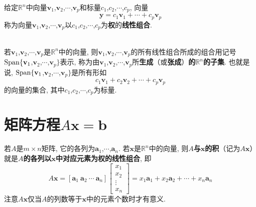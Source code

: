 给定$\mathbb{R}^n$中向量$\mathbf{v}_1$,$\mathbf{v}_2$,$\cdots$,$\mathbf{v}_p$和标量$c_1$,$c_2$,$\cdots$,$c_p$, 向量
	\[\mathbf{y}=c_1\mathbf{v}_1+\cdots+c_p\mathbf{v}_p\]
称为向量$\mathbf{v}_1$,$\mathbf{v}_2$,$\cdots$,$\mathbf{v}_p$以$c_1$,$c_2$,$\cdots$,$c_p$为\textbf{权}的\textbf{线性组合}.\\[2ex]

\\[4ex]

\begin{definition}
若$\mathbf{v}_1$,$\mathbf{v}_2$,$\cdots$,$\mathbf{v}_p$是$\mathbb{R}^n$中的向量, 则$\mathbf{v}_1$,$\mathbf{v}_2$,$\cdots$,$\mathbf{v}_p$的所有线性组合所成的组合用记号$\operatorname{Span}\{\mathbf{v}_1$,$\mathbf{v}_2$,$\cdots$,$\mathbf{v}_p\}$表示, 称为由$\mathbf{v}_1$,$\mathbf{v}_2$,$\cdots$,$\mathbf{v}_p$所\textbf{生成}（或\textbf{张成}）\textbf{的$\mathbb{R}^n$的子集}. 也就是说, $\operatorname{Span}\{\mathbf{v}_1$,$\mathbf{v}_2$,$\cdots$,$\mathbf{v}_p\}$是所有形如
	\[c_1\mathbf{v}_1+c_2\mathbf{v}_2+\cdots+c_p\mathbf{v}_p\]
的向量的集合, 其中$c_1$,$c_2$,$\cdots$,$c_p$为标量.\\[2ex]
\end{definition}\vspace{4ex}

\section{矩阵方程$A\mathbf{x}=\mathbf{b}$}
\begin{definition}
若$A$是$m\times n$矩阵, 它的各列为$\bm{a}_1$,$\cdots$,$\bm{a}_n$. 若$\bm{x}$是$\mathbb{R}^n$中的向量, 则\textbf{$A$与$\bm{x}$的积}（记为$A\bm{x}$）就是\textbf{$A$的各列以$\bm{x}$中对应元素为权的线性组合}, 即
	\[A\bm{x}=[\bm{a}_1\ \bm{a}_2\ \cdots\ \bm{a}_n]\left[\begin{array}{c}x_1\\x_2\\\vdots\\x_n\end{array}\right]=x_1\bm{a}_1+x_2\bm{a}_2+\cdots+x_n\bm{a}_n\]
注意$A\bm{x}$仅当$A$的列数等于$\bm{x}$中的元素个数时才有意义.\\[2ex]
\end{definition}

